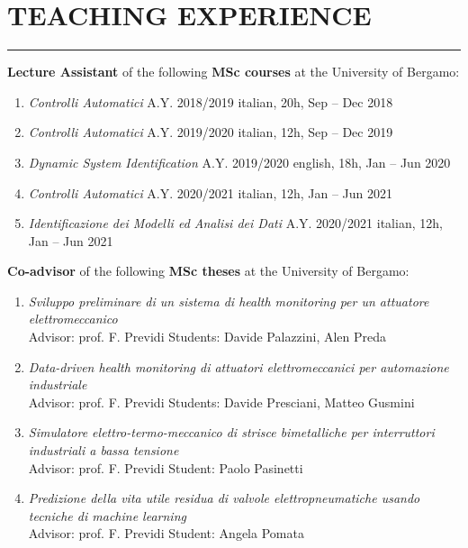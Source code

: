 \documentclass[10pt]{article}
\newcommand{\cvsection}[1]{\section*{\centering\normalsize\uppercase{#1}}\vspace{-16pt}\rule{\linewidth}{0.2pt}\vspace{6pt}}
\begin{document}

\cvsection{teaching experience}

\textbf{Lecture Assistant} of the following \textbf{MSc courses} at the University of Bergamo:
\begin{enumerate}
	\setlength\itemsep{-3pt}
	\item \textit{Controlli Automatici} A.Y. 2018/2019 \hfill italian, 20h, Sep – Dec 2018\\
	\item \textit{Controlli Automatici} A.Y. 2019/2020 \hfill italian, 12h, Sep – Dec 2019\\
	\item \textit{Dynamic System Identification} A.Y. 2019/2020 \hfill english, 18h, Jan – Jun 2020\\
	\item \textit{Controlli Automatici} A.Y. 2020/2021 \hfill italian, 12h, Jan – Jun 2021\\
	\item \textit{Identificazione dei Modelli ed Analisi dei Dati} A.Y. 2020/2021 \hfill italian, 12h, Jan – Jun 2021
\end{enumerate}

\vspace{6pt} %

\textbf{Co-advisor} of the following \textbf{MSc theses} at the University of Bergamo:
\begin{enumerate}
	\setlength\itemsep{-3pt}
	\item \textit{Sviluppo preliminare di un sistema di health monitoring per un attuatore elettromeccanico}\\
	Advisor: prof. F. Previdi \hfill Students: Davide Palazzini, Alen Preda
	\item \textit{Data-driven health monitoring di attuatori elettromeccanici per automazione industriale}\\
	Advisor: prof. F. Previdi \hfill Students: Davide Presciani, Matteo Gusmini
	\item \textit{Simulatore elettro-termo-meccanico di strisce bimetalliche per interruttori industriali a bassa tensione}\\
	Advisor: prof. F. Previdi \hfill Student: Paolo Pasinetti
	\item \textit{Predizione della vita utile residua di valvole elettropneumatiche usando tecniche di machine learning}\\
	Advisor: prof. F. Previdi \hfill Student: Angela Pomata
\end{enumerate}
\end{document}
